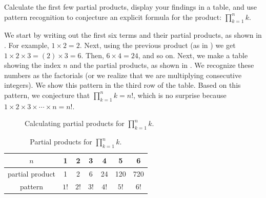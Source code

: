 \begin{exam}
\label{exam_conj_explicit_prod_linear}
    Calculate the first few partial products, display your findings in a table, and use pattern recognition to conjecture an explicit formula for the product: $\displaystyle \prod_{k=1}^nk$.    
        \begin{soln}
            We start by writing out the first six terms and their partial products, as shown in .  
            For example, $1 \times 2 = 2$.  Next, using the previous product (as in ) we get $1 \times 2 \times 3 = (2) \times 3 = 6$.  Then, $6 \times 4 = 24$, and so on. 
            Next, we make a table showing the index $n$ and the partial products, as shown in .          
            We recognize these numbers as the factorials (or we realize that we are multiplying consecutive integers).  We show this pattern in the third row of the table.  Based on this pattern, we conjecture that $\displaystyle \prod_{k=1}^nk=n!$, which is no surprise because $1 \times 2 \times 3 \times \cdots \times n = n!$.
                \end{soln}     
                
                \begin{figure}[hbtp]
                    \centering
                    \scalebox{0.75}{}  
                    \caption{Calculating partial products for $\displaystyle \prod_{k=1}^nk$.}
                    \label{fig_part_product_linear}
                \end{figure}
                
                \begin{table}[hbtp]
                    \centering
                    \begin{tabular}{c|c|c|c|c|c|c}
                        $n$ & 1 & 2 & 3 & 4 & 5 & 6 \\ \hline
                        partial product  & 1 & 2 & 6 & 24 & 120 & 720 \\ \hline  
                        pattern & $1!$ & $2!$ & $3!$ & $4!$ & $5!$ & $6!$ 
                    \end{tabular}
                    \caption{Partial products for $\displaystyle \prod_{k=1}^nk$.}
                    \label{tab_partial_products_linear}
                \end{table}
\end{exam}

